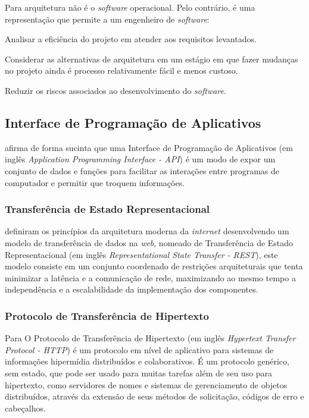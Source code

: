 Para  arquitetura não é o \textit{software} operacional. Pelo contrário, é uma representação que permite a um engenheiro de \textit{software}:

\begin{lista}
\item Analisar a eficiência do projeto em atender aos requisitos levantados.
\item Considerar as alternativas de arquitetura em um estágio em que fazer mudanças no projeto ainda é processo relativamente fácil e menos custoso.
\item Reduzir os riscos associados ao desenvolvimento do \textit{software}.
\end{lista}

\subsection{Interface de Programação de Aplicativos}

 afirma de forma sucinta que uma Interface de Programação de Aplicativos (em inglês \textit{Application Programming Interface - API}) é um modo de expor um conjunto de dados e funções para facilitar as interações entre programas de computador e permitir que troquem informações.

\subsubsection{Transferência de Estado Representacional}

 definiram os princípios da arquitetura moderna da \textit{internet} desenvolvendo um modelo de transferência de dados na \textit{web}, nomeado de Transferência de Estado Representacional (em inglês \textit{Representational State Transfer - REST}), este modelo consiste em um conjunto coordenado de restrições arquiteturais que tenta minimizar a latência e a comunicação de rede, maximizando ao mesmo tempo a independência e a escalabilidade da implementação dos componentes.

\subsubsection{Protocolo de Transferência de Hipertexto}

Para  O Protocolo de Transferência de Hipertexto (em inglês \textit{Hypertext Transfer Protocol - HTTP}) é um protocolo em nível de aplicativo para sistemas de informações hipermídia distribuídos e colaborativos. É um protocolo genérico, sem estado, que pode ser usado para muitas tarefas além de seu uso para hipertexto, como servidores de nomes e sistemas de gerenciamento de objetos distribuídos, através da extensão de seus métodos de solicitação, códigos de erro e cabeçalhos.

